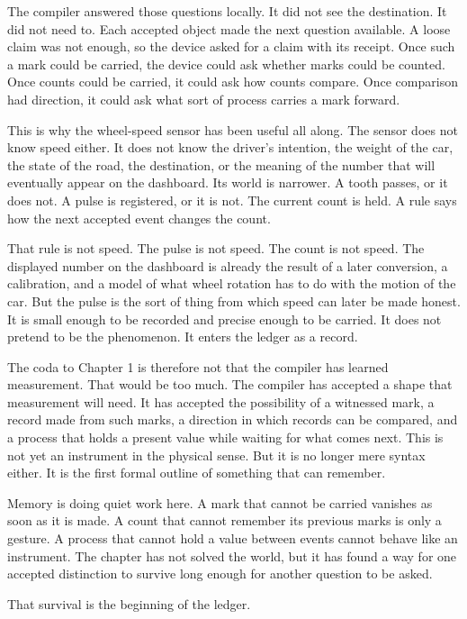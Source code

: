 The compiler answered those questions locally. It did not see the destination.
It did not need to. Each accepted object made the next question available. A
loose claim was not enough, so the device asked for a claim with its receipt.
Once such a mark could be carried, the device could ask whether marks could be
counted. Once counts could be carried, it could ask how counts compare. Once
comparison had direction, it could ask what sort of process carries a mark
forward.

This is why the wheel-speed sensor has been useful all along. The sensor does
not know speed either. It does not know the driver's intention, the weight of
the car, the state of the road, the destination, or the meaning of the number
that will eventually appear on the dashboard. Its world is narrower. A tooth
passes, or it does not. A pulse is registered, or it is not. The current count
is held. A rule says how the next accepted event changes the count.

That rule is not speed. The pulse is not speed. The count is not speed. The
displayed number on the dashboard is already the result of a later conversion,
a calibration, and a model of what wheel rotation has to do with the motion of
the car. But the pulse is the sort of thing from which speed can later be made
honest. It is small enough to be recorded and precise enough to be carried. It
does not pretend to be the phenomenon. It enters the ledger as a record.

The coda to Chapter 1 is therefore not that the compiler has learned
measurement. That would be too much. The compiler has accepted a shape that
measurement will need. It has accepted the possibility of a witnessed mark, a
record made from such marks, a direction in which records can be compared, and
a process that holds a present value while waiting for what comes next. This is
not yet an instrument in the physical sense. But it is no longer mere syntax
either. It is the first formal outline of something that can remember.

Memory is doing quiet work here. A mark that cannot be carried vanishes as soon
as it is made. A count that cannot remember its previous marks is only a
gesture. A process that cannot hold a value between events cannot behave like
an instrument. The chapter has not solved the world, but it has found a way for
one accepted distinction to survive long enough for another question to be
asked.

That survival is the beginning of the ledger.

